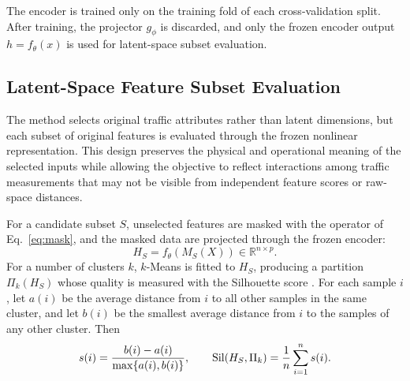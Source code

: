 The encoder is trained only on the training fold of each cross-validation split.  After training, the projector $g_\phi$ is discarded, and only the frozen encoder output $h = f_\theta(x)$ is used for latent-space subset evaluation.

\subsection{Latent-Space Feature Subset Evaluation}
\label{sec:objective}

The method selects original traffic attributes rather than latent dimensions, but each subset of original features is evaluated through the frozen nonlinear representation. This design preserves the physical and operational meaning of the selected inputs while allowing the objective to reflect interactions among traffic measurements that may not be visible from independent feature scores or raw-space distances.

For a candidate subset $S$, unselected features are masked with the operator of Eq.~\eqref{eq:mask}, and the masked data are projected through the frozen encoder:
\begin{equation}
H_S = f_\theta(M_S(X)) \in \mathbb{R}^{n \times p}.
\end{equation}
For a number of clusters $k$, $k$-Means is fitted to $H_S$, producing a partition $\Pi_k(H_S)$ whose quality is measured with the Silhouette score \cite{rousseeuw1987silhouettes}. For each sample $i$, let $a(i)$ be the average distance from $i$ to all other samples in the same cluster, and let $b(i)$ be the smallest average distance from $i$ to the samples of any other cluster. Then
\begin{equation}
s(i) = \frac{b(i) - a(i)}{\max\{a(i), b(i)\}}, \qquad
\operatorname{Sil}(H_S, \Pi_k) = \frac{1}{n}\sum_{i=1}^{n} s(i).
\end{equation}


